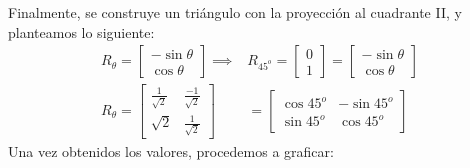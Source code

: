 Finalmente, se construye un triángulo con la proyección al cuadrante II,
y planteamos lo siguiente:
\begin{align*}
	R_{\theta}=\begin{bmatrix}
		           -\sin{\theta} \\ \cos{\theta}
	           \end{bmatrix} \implies                                                                                          & R_{45^{o}}=\begin{bmatrix}
		                                                                                                                                        0 \\ 1
	                                                                                                                                        \end{bmatrix}= \begin{bmatrix}
		                                                                                                                                                       -\sin{\theta} \\ \cos{\theta}
	                                                                                                                                                       \end{bmatrix}      \\
	R_{\theta}= \begin{bmatrix}
		            \frac{1}{\sqrt{2}} & \frac{-1}{\sqrt{2}} \\ \sqrt{2} & \frac{1}{\sqrt{2}}
	            \end{bmatrix} & = \begin{bmatrix}
		                              \cos{45^{o}} & -\sin{45^{o}} \\ \sin{45^{o}} & \cos{45^{o}}
	                              \end{bmatrix}
\end{align*}
Una vez obtenidos los valores, procedemos a graficar:

